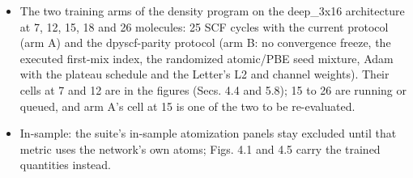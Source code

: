 \documentclass[10pt,a4paper]{article}
\begin{document}
\begin{itemize}
\item The two training arms of the density program on the deep\_3x16 architecture at 7, 12, 15, 18 and 26 molecules: 25 SCF cycles with the current protocol (arm A) and the dpyscf-parity protocol (arm B: no convergence freeze, the executed first-mix index, the randomized atomic/PBE seed mixture, Adam with the plateau schedule and the Letter's L2 and channel weights). Their cells at 7 and 12 are in the figures (Secs. 4.4 and 5.8); 15 to 26 are running or queued, and arm A's cell at 15 is one of the two to be re-evaluated.
\item In-sample: the suite's in-sample atomization panels stay excluded until that metric uses the network's own atoms; Figs. 4.1 and 4.5 carry the trained quantities instead.
\end{itemize}
\end{document}
